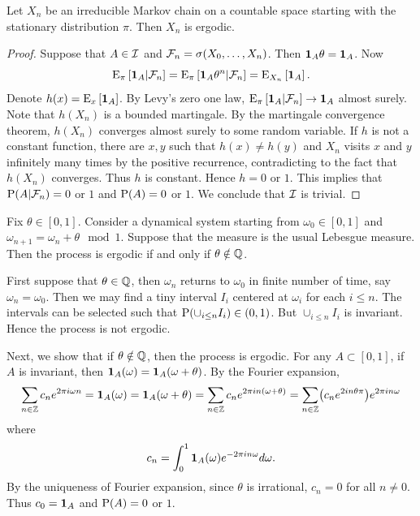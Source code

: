 \begin{theorem}
    Let $X_n$ be an irreducible Markov chain on a countable space starting with the stationary 
    distribution $\pi$. Then $X_n$ is ergodic. 
\end{theorem}
\begin{proof}
    Suppose that $A\in\I$ and $\F_n = \sigma(X_0,\ldots,X_n)$. Then 
    $\one_A\theta = \one_A$. Now 
    \begin{equation*}
        \E_\pi\sbrc{\one_A|\F_n} = \E_\pi\sbrc{\one_A\theta^n|\F_n} 
        = \E_{X_n}\sbrc{\one_A}.  
    \end{equation*}
    Denote $h(x) = \E_x\sbrc{\one_A}$. By Levy's zero one law, 
    $\E_\pi\sbrc{\one_A|\F_n}\to\one_A$ almost surely. Note that 
    $h(X_n)$ is a bounded martingale. By the martingale convergence 
    theorem, $h(X_n)$ converges almost surely to some random 
    variable. If $h$ is not a constant function, there are $x,y$ 
    such that $h(x)\neq h(y)$ and $X_n$ visits $x$ and $y$ infinitely 
    many times by the positive recurrence, contradicting to the fact 
    that $h(X_n)$ converges. Thus $h$ is constant. Hence $h = 0$ or $1$. 
    This implies that $\P(A|\F_n) = 0$ or $1$ and $\P(A) = 0$ or $1$. 
    We conclude that $\I$ is trivial.  
\end{proof}

\begin{example}
    Fix $\theta\in [0,1]$. Consider a dynamical system 
    starting from $\omega_0\in[0,1]$ and $\omega_{n+1} = \omega_n 
    + \theta\mod 1$. Suppose that the measure is the usual 
    Lebesgue measure. Then the process is ergodic if and only if 
    $\theta\notin\Q$. 
    
    First suppose that $\theta\in\Q$, then $\omega_n$ returns to $\omega_0$ 
    in finite number of time, say $\omega_n = \omega_0$. Then we may 
    find a tiny interval $I_i$ centered at $\omega_i$ for each $i\leq n$.  
    The intervals can be selected such that $\P(\cup_{i\leq n}I_i)\in (0,1)$. 
    But $\cup_{i\leq n}I_i$ is invariant. Hence the process is not 
    ergodic. 
    
    Next, we show that if $\theta\notin\Q$, then the process is ergodic. 
    For any $A\subset [0,1]$, if $A$ is invariant, then $\one_A(\omega) 
    = \one_A(\omega + \theta)$. By the Fourier expansion, 
    \begin{equation*}
        \sum_{n\in\Z} c_n e^{2\pi i\omega n} = \one_A(\omega) = \one_A(\omega + \theta) 
        = \sum_{n\in\Z} c_n e^{2\pi in(\omega + \theta)} = \sum_{n\in\Z} \pth{c_n e^{2in\theta\pi}} e^{2\pi in\omega}
    \end{equation*}
    where 
    \begin{equation*}
        c_n = \int_0^{1} \one_A(\omega) e^{-2\pi in\omega}d\omega. 
    \end{equation*}
    By the uniqueness of Fourier expansion, since $\theta$ is irrational, 
    $c_n = 0$ for all $n\neq 0$. Thus $c_0 = \one_A$ and $\P(A) = 0$ 
    or $1$. 
\end{example}

